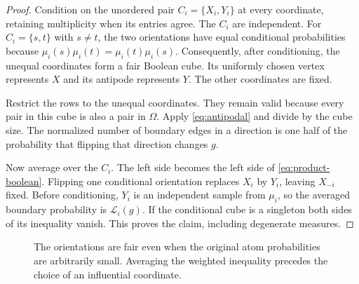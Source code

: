 \documentclass[11pt,reqno]{amsart}
\theoremstyle{definition}
\theoremstyle{remark}
\newcommand{\cL}{\mathcal L}
\numberwithin{equation}{section}
\begin{document}
\begin{proof}
Condition on the unordered pair $C_i=\{X_i,Y_i\}$ at every coordinate,
retaining multiplicity when its entries agree. The $C_i$ are independent.
For $C_i=\{s,t\}$ with $s\ne t$, the two orientations have equal conditional
probabilities because
$\mu_i(s)\mu_i(t)=\mu_i(t)\mu_i(s)$.
Consequently, after conditioning, the unequal coordinates form a fair
Boolean cube. Its uniformly chosen vertex represents $X$ and its antipode
represents $Y$. The other coordinates are fixed.

Restrict the rows to the unequal coordinates. They remain valid because
every pair in this cube is also a pair in $\Omega$. Apply
\eqref{eq:antipodal} and divide by the cube size. The normalized number of
boundary edges in a direction is one half of the probability that flipping
that direction changes $g$.

Now average over the $C_i$. The left side becomes the left side of
\eqref{eq:product-boolean}. Flipping one conditional orientation replaces
$X_i$ by $Y_i$, leaving $X_{-i}$ fixed. Before conditioning, $Y_i$ is an
independent sample from $\mu_i$, so the averaged boundary probability is
$\cL_i(g)$. If the conditional cube is a singleton both sides of its
inequality vanish. This proves the claim, including degenerate measures.
\end{proof}

\begin{figure}[tb]
\centering
{}
\caption{The orientations are fair even when the original atom
probabilities are arbitrarily small. Averaging the weighted inequality
precedes the choice of an influential coordinate.}
\end{figure}
\end{document}
